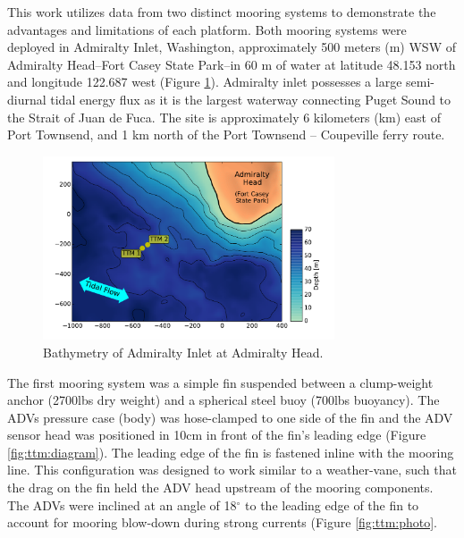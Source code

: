 \documentclass[twocol]{ametsoc}
\begin{document}
This work utilizes data from two distinct mooring systems to demonstrate the advantages and limitations of each platform. Both mooring systems were deployed in Admiralty Inlet, Washington, approximately 500 meters (m) WSW of Admiralty Head--Fort Casey State Park--in 60 m of water at latitude 48.153 north and longitude 122.687 west (Figure \ref{fig:map}). Admiralty inlet possesses a large semi-diurnal tidal energy flux as it is the largest waterway connecting Puget Sound to the Strait of Juan de Fuca. The site is approximately 6 kilometers (km) east of Port Townsend, and 1 km north of the Port Townsend -- Coupeville ferry route.

\begin{figure}[t]
  \centering
  \includegraphics[width=3.4in]{map02}
  \caption{Bathymetry of Admiralty Inlet at Admiralty Head.}
  \label{fig:map}
\end{figure}

The first mooring system was a simple fin suspended between a clump-weight anchor (2700lbs dry weight) and a spherical steel buoy (700lbs buoyancy). The ADVs pressure case (body) was hose-clamped to one side of the fin and the ADV sensor head was positioned in 10cm in front of the fin's leading edge (Figure \ref{fig:ttm:diagram}). The leading edge of the fin is fastened inline with the mooring line. This configuration  was designed to work similar to a weather-vane, such that the drag on the fin held the ADV head upstream of the mooring components. The ADVs were inclined at an angle of 18$^\circ$ to the leading edge of the fin to account for mooring blow-down during strong currents (Figure \ref{fig:ttm:photo}.
\end{document}
